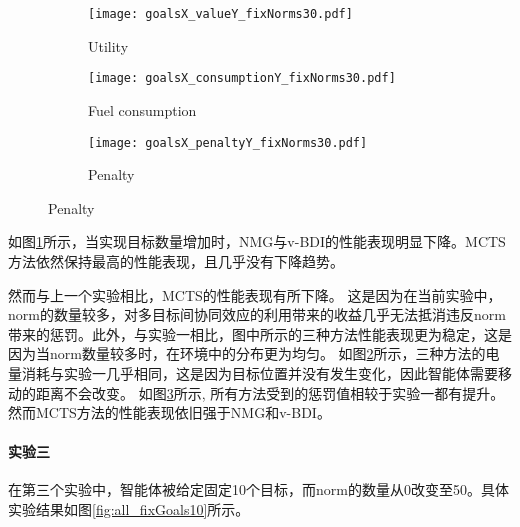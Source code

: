 \begin{figure}
\centering
\begin{subfigure}{.47\textwidth}
  \centering
  \texttt{[image: goalsX\_valueY\_fixNorms30.pdf]}
  \captionsetup{justification=centering}
  \caption{Utility}
  \label{fig:goalsX_valueY_fixNorms30}
\end{subfigure}

\begin{subfigure}{.47\textwidth}
  \centering
  \texttt{[image: goalsX\_consumptionY\_fixNorms30.pdf]}
  \captionsetup{justification=centering}
  \caption{Fuel consumption}
  \label{fig:goalsX_consumptionY_fixNorms30}
\end{subfigure}
\begin{subfigure}{.47\textwidth}
  \centering
  \texttt{[image: goalsX\_penaltyY\_fixNorms30.pdf]}
  \captionsetup{justification=centering}
  \caption{Penalty}
  \label{fig:goalsX_penaltyY_fixNorms30}
\end{subfigure}
\captionsetup{justification=centering}
\label{fig:all_fixNorms30}
\end{figure}

如图\ref{fig:goalsX_valueY_fixNorms30}所示，当实现目标数量增加时，NMG与v-BDI的性能表现明显下降。MCTS方法依然保持最高的性能表现，且几乎没有下降趋势。

然而与上一个实验相比，MCTS的性能表现有所下降。
这是因为在当前实验中，norm的数量较多，对多目标间协同效应的利用带来的收益几乎无法抵消违反norm带来的惩罚。此外，与实验一相比，图中所示的三种方法性能表现更为稳定，这是因为当norm数量较多时，在环境中的分布更为均匀。
如图\ref{fig:goalsX_consumptionY_fixNorms30}所示，三种方法的电量消耗与实验一几乎相同，这是因为目标位置并没有发生变化，因此智能体需要移动的距离不会改变。
如图\ref{fig:goalsX_penaltyY_fixNorms30}所示, 所有方法受到的惩罚值相较于实验一都有提升。然而MCTS方法的性能表现依旧强于NMG和v-BDI。

\paragraph{实验三}
在第三个实验中，智能体被给定固定10个目标，而norm的数量从0改变至50。具体实验结果如图\ref{fig:all_fixGoals10}所示。

